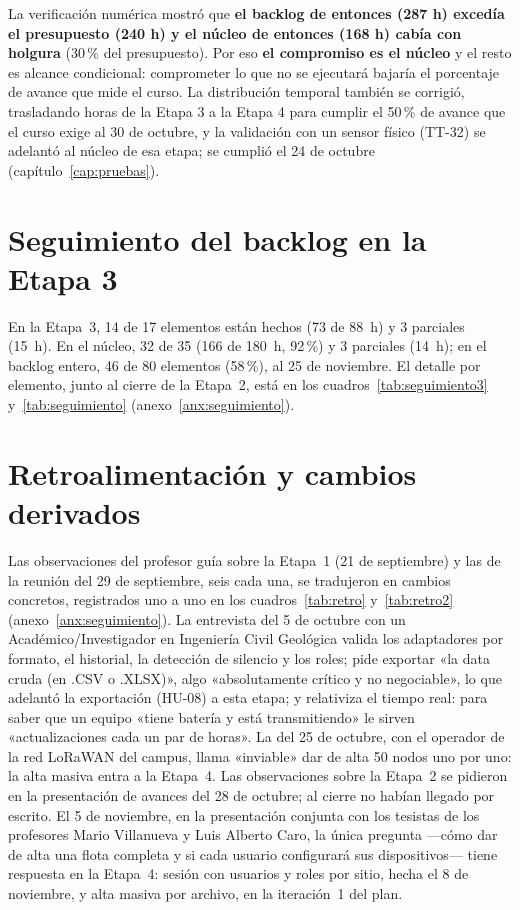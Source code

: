 La verificación numérica mostró que \textbf{el backlog de entonces (287 h) excedía
el presupuesto (240 h) y el núcleo de entonces (168 h) cabía con holgura} (30\,\% del presupuesto). Por eso
\textbf{el compromiso es el núcleo} y el resto es alcance condicional: comprometer lo que no se ejecutará bajaría el porcentaje de avance que mide el curso. La distribución temporal también se corrigió, trasladando horas de la Etapa 3 a la Etapa 4 para cumplir el 50\,\% de avance que el curso exige al 30 de octubre, y la validación con un sensor físico (TT-32) se adelantó al núcleo de esa etapa; se cumplió el 24 de octubre (capítulo~\ref{cap:pruebas}).

\section{Seguimiento del backlog en la Etapa 3}
\label{sec:seguimiento}

En la Etapa~3, 14 de 17 elementos están hechos (73 de 88~h) y 3 parciales (15~h). En el núcleo, 32 de 35 (166 de 180~h, 92\,\%) y 3 parciales (14~h); en el backlog entero, 46 de 80 elementos (58\,\%), al 25 de noviembre. El detalle por elemento, junto al cierre de la Etapa~2, está en los cuadros~\ref{tab:seguimiento3} y~\ref{tab:seguimiento} (anexo~\ref{anx:seguimiento}).

\section{Retroalimentación y cambios derivados}
\label{sec:retro}

Las observaciones del profesor guía sobre la Etapa~1 (21 de septiembre) y las de la reunión del 29 de septiembre, seis
cada una, se tradujeron en cambios concretos, registrados uno a uno en los cuadros~\ref{tab:retro} y~\ref{tab:retro2}
(anexo~\ref{anx:seguimiento}). La entrevista del 5 de octubre con un Académico/Investigador en Ingeniería Civil Geológica valida los adaptadores por formato, el historial, la detección de silencio
y los roles; pide exportar «la data cruda (en .CSV o .XLSX)», algo «absolutamente crítico y no negociable», lo que
adelantó la exportación (HU-08) a esta etapa; y relativiza el tiempo real: para saber que un equipo «tiene batería y
está transmitiendo» le sirven «actualizaciones cada un par de horas». La del 25 de octubre, con el operador de la red LoRaWAN del campus, llama «inviable» dar de alta 50 nodos uno por uno:
la alta masiva entra a la Etapa~4. Las observaciones sobre la Etapa~2 se pidieron en la presentación de avances del 28 de octubre; al cierre no habían llegado por escrito. El 5 de noviembre, en la presentación conjunta con los tesistas de los profesores Mario Villanueva y Luis Alberto Caro, la única pregunta —cómo dar de alta una flota completa y si cada usuario configurará sus dispositivos— tiene respuesta en la Etapa~4: sesión con usuarios y roles por sitio, hecha el 8 de noviembre, y alta masiva por archivo, en la iteración~1 del plan.

